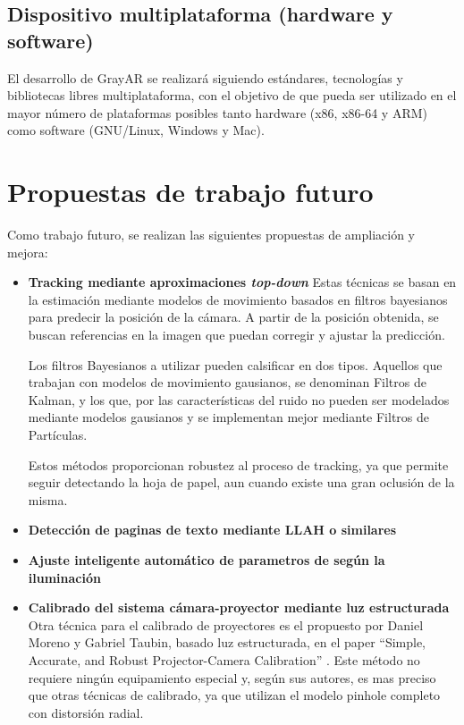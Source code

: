 \subsection{Dispositivo multiplataforma (hardware y software)}
El desarrollo de GrayAR se realizará siguiendo estándares, tecnologías y bibliotecas libres multiplataforma, con el objetivo de que pueda ser utilizado en el mayor número de plataformas posibles tanto hardware (x86, x86-64 y ARM) como software (GNU/Linux, Windows y Mac).

\section{Propuestas de trabajo futuro}

Como trabajo futuro, se realizan las siguientes propuestas de ampliación y mejora:
\begin{itemize}
\item \textbf{Tracking mediante aproximaciones \emph{top-down}} Estas técnicas se basan en la estimación mediante modelos de movimiento basados en filtros bayesianos para predecir la posición de la cámara. A partir de la posición obtenida, se buscan referencias en la imagen que puedan corregir y ajustar la predicción.
  
  Los filtros Bayesianos a utilizar pueden calsificar en dos tipos. Aquellos que trabajan con modelos de movimiento gausianos, se denominan Filtros de Kalman, y los que, por las características del ruido no pueden ser modelados mediante modelos gausianos y se implementan mejor mediante Filtros de Partículas.
  
  Estos métodos proporcionan robustez al proceso de tracking, ya que permite seguir detectando la hoja de papel, aun cuando existe una gran oclusión de la misma. 

\item \textbf{Detección de paginas de texto mediante LLAH o similares}
  
\item \textbf{Ajuste inteligente automático de parametros de según la iluminación}

\item \textbf{Calibrado del sistema cámara-proyector mediante luz estructurada} Otra técnica para el calibrado de proyectores es el propuesto por Daniel Moreno y Gabriel Taubin, basado luz estructurada, en el paper ``Simple, Accurate, and Robust Projector-Camera Calibration'' \cite{Moreno}. Este método no requiere ningún equipamiento especial y, según sus autores, es mas preciso que otras técnicas de calibrado, ya que utilizan el modelo pinhole completo con distorsión radial. 


\end{itemize}
